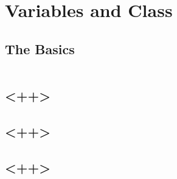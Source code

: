 \chapter{Variables and Class}

\section{The Basics}
\inputminted{cpp}{../cpp/01_varandclass/ex1.cpp}

\section{<++>}

\section{<++>}

\section{<++>}


